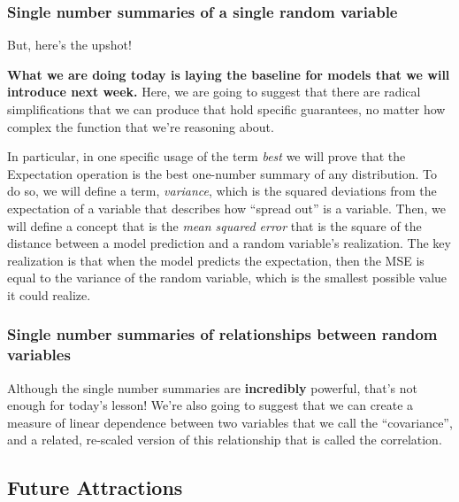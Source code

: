 \documentclass[
]{book}
\theoremstyle{definition}
\theoremstyle{definition}
\theoremstyle{definition}
\theoremstyle{definition}
\theoremstyle{remark}
\begin{document}
\hypertarget{single-number-summaries-of-a-single-random-variable}{%
\subsubsection{Single number summaries of a single random variable}\label{single-number-summaries-of-a-single-random-variable}}

But, here's the upshot!

\textbf{What we are doing today is laying the baseline for models that we will introduce next week.} Here, we are going to suggest that there are radical simplifications that we can produce that hold specific guarantees, no matter how complex the function that we're reasoning about.

In particular, in one specific usage of the term \emph{best} we will prove that the Expectation operation is the best one-number summary of any distribution. To do so, we will define a term, \emph{variance}, which is the squared deviations from the expectation of a variable that describes how ``spread out'' is a variable. Then, we will define a concept that is the \emph{mean squared error} that is the square of the distance between a model prediction and a random variable's realization. The key realization is that when the model predicts the expectation, then the MSE is equal to the variance of the random variable, which is the smallest possible value it could realize.

\hypertarget{single-number-summaries-of-relationships-between-random-variables}{%
\subsubsection{Single number summaries of relationships between random variables}\label{single-number-summaries-of-relationships-between-random-variables}}

Although the single number summaries are \textbf{incredibly} powerful, that's not enough for today's lesson! We're also going to suggest that we can create a measure of linear dependence between two variables that we call the ``covariance'', and a related, re-scaled version of this relationship that is called the correlation.

\hypertarget{future-attractions}{%
\subsection{Future Attractions}\label{future-attractions}}
\end{document}

